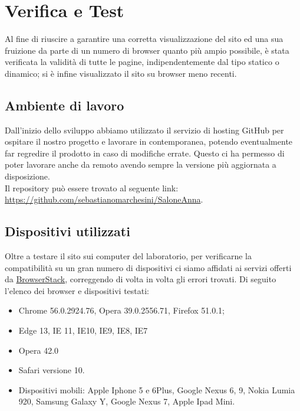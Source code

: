 \section{Verifica e Test}{
	Al fine di riuscire a garantire una corretta visualizzazione del sito ed una sua fruizione da parte di un numero di browser quanto più ampio possibile, è stata verificata la validità di tutte le pagine, indipendentemente dal tipo statico o dinamico; si è infine visualizzato il sito su browser meno recenti.
	\subsection{Ambiente di lavoro}{
		Dall'inizio dello sviluppo abbiamo utilizzato il servizio di hosting GitHub per ospitare il nostro progetto e lavorare in contemporanea, potendo eventualmente far regredire il prodotto in caso di modifiche errate. Questo ci ha permesso di poter lavorare anche da remoto avendo sempre la versione più aggiornata a disposizione.\\
		Il repository può essere trovato al seguente link: \url{https://github.com/sebastianomarchesini/SaloneAnna}.
	}
	\subsection{Dispositivi utilizzati}{
		Oltre a testare il sito sui computer del laboratorio, per verificarne la compatibilità su un gran numero di dispositivi ci siamo affidati ai servizi offerti da \href{https://www.browserstack.com/screenshots}{BrowserStack}, correggendo di volta in volta gli errori trovati.
		Di seguito l'elenco dei browser e dispositivi testati:
		\begin{itemize}\itemsep1pt
			\item Chrome 56.0.2924.76, Opera 39.0.2556.71, Firefox 51.0.1;
			\item Edge 13, IE 11, IE10, IE9, IE8, IE7
			\item Opera 42.0
			\item Safari versione 10.
			\item Dispositivi mobili: Apple Iphone 5 e 6Plus, Google Nexus 6, 9, Nokia Lumia 920, Samsung Galaxy Y, Google Nexus 7, Apple Ipad Mini.
		\end{itemize}
	}
}
